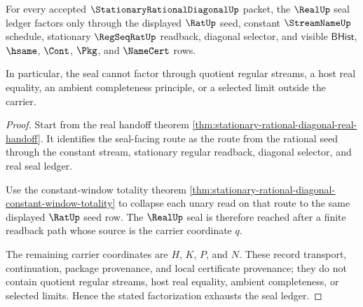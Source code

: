 \begin{theorem}
\label{thm:stationary-rational-diagonal-seal-factorization}
For every accepted $\StationaryRationalDiagonalUp$ packet, the $\RealUp$ seal
ledger factors only through the displayed $\RatUp$ seed, constant
$\StreamNameUp$ schedule, stationary $\RegSeqRatUp$ readback, diagonal selector,
and visible $\mathsf{BHist}$, $\hsame$, $\Cont$, $\Pkg$, and $\NameCert$ rows.

In particular, the seal cannot factor through quotient regular streams, a host
real equality, an ambient completeness principle, or a selected limit outside
the carrier.
\end{theorem}
\begin{proof}
Start from the real handoff theorem
\autoref{thm:stationary-rational-diagonal-real-handoff}. It identifies the
seal-facing route as the route from the rational seed through the constant
stream, stationary regular readback, diagonal selector, and real seal ledger.

Use the constant-window totality theorem
\autoref{thm:stationary-rational-diagonal-constant-window-totality} to collapse
each unary read on that route to the same displayed $\RatUp$ seed row. The
$\RealUp$ seal is therefore reached after a finite readback path whose source is
the carrier coordinate $q$.

The remaining carrier coordinates are $H$, $K$, $P$, and $N$. These record
transport, continuation, package provenance, and local certificate provenance;
they do not contain quotient regular streams, host real equality, ambient
completeness, or selected limits. Hence the stated factorization exhausts the
seal ledger.
\end{proof}

